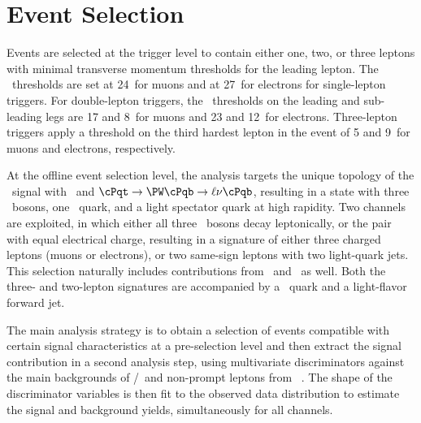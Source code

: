 \section{Event Selection}\label{sec:eventselection}
Events are selected at the trigger level to contain either one, two, or three leptons with minimal transverse momentum thresholds for the leading lepton.  The \pt\ thresholds are set at 24\GeV\ for muons and at 27\GeV\ for electrons for single-lepton triggers.
For double-lepton triggers, the \pt\ thresholds on the leading and sub-leading legs are 17 and 8\GeV\ for muons and 23 and 12\GeV\ for electrons.
Three-lepton triggers apply a threshold on the third hardest lepton in the event of 5 and 9\GeV\ for muons and electrons, respectively.

At the offline event selection level, the analysis targets the unique topology of the \tHq\ signal with \HWW\ and $\cPqt\to\PW\cPqb\to\ell\nu\cPqb$, resulting in a state with three \PW\ bosons, one \cPqb\ quark, and a light spectator quark at high rapidity.
Two channels are exploited, in which either all three \PW\ bosons decay leptonically, or the pair with equal electrical charge, resulting in a signature of either three charged leptons (muons or electrons), or two same-sign leptons with two light-quark jets.
This selection naturally includes contributions from \HTT\ and \HZZ\ as well.
Both the three- and two-lepton signatures are accompanied by a \cPqb\ quark and a light-flavor forward jet.

The main analysis strategy is to obtain a selection of events compatible with certain signal characteristics at a pre-selection level and then extract the signal contribution in a second analysis step, using multivariate discriminators against the main backgrounds of \ttW/\ttZ\ and non-prompt leptons from \ttbar\ .
The shape of the discriminator variables is then fit to the observed data distribution to estimate the signal and background yields, simultaneously for all channels.

